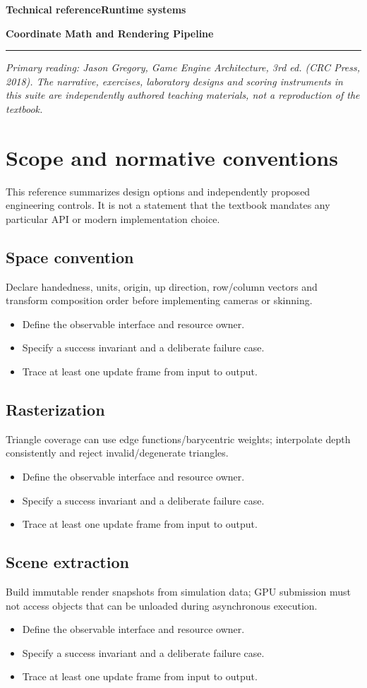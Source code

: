 \documentclass[11pt,letterpaper]{article}
\newcommand{\DocType}{Reference}
\newcommand{\SuiteHeading}[3]{%
\renewcommand{\DocType}{#2}%
{\small\bfseries\sffamily\color{EngineTeal}#2\hfill #3}\par\vspace{6pt}
{\LARGE\bfseries\color{EngineBlue}#1}\par\vspace{4pt}
{\color{EngineTeal}\rule{\linewidth}{1pt}}\par\vspace{7pt}}
\newcommand{\SourceNote}{\footnotesize\textit{Primary reading: Jason Gregory, \emph{Game Engine Architecture}, 3rd ed. (CRC Press, 2018). The narrative, exercises, laboratory designs and scoring instruments in this suite are independently authored teaching materials, not a reproduction of the textbook.}\normalsize\par}
\begin{document}
\SuiteHeading{Coordinate Math and Rendering Pipeline}{Technical reference}{Runtime systems}
\SourceNote
\section{Scope and normative conventions}
This reference summarizes design options and independently proposed engineering controls. It is not a statement that the textbook mandates any particular API or modern implementation choice.

\subsection{Space convention}
Declare handedness, units, origin, up direction, row/column vectors and transform composition order before implementing cameras or skinning.

\begin{itemize}
\item Define the observable interface and resource owner.
\item Specify a success invariant and a deliberate failure case.
\item Trace at least one update frame from input to output.
\end{itemize}
\subsection{Rasterization}
Triangle coverage can use edge functions/barycentric weights; interpolate depth consistently and reject invalid/degenerate triangles.

\begin{itemize}
\item Define the observable interface and resource owner.
\item Specify a success invariant and a deliberate failure case.
\item Trace at least one update frame from input to output.
\end{itemize}
\subsection{Scene extraction}
Build immutable render snapshots from simulation data; GPU submission must not access objects that can be unloaded during asynchronous execution.

\begin{itemize}
\item Define the observable interface and resource owner.
\item Specify a success invariant and a deliberate failure case.
\item Trace at least one update frame from input to output.
\end{itemize}
\end{document}
